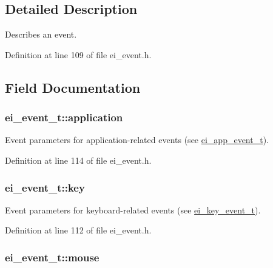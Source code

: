 \subsection{Detailed Description}
Describes an event. 

Definition at line 109 of file ei\+\_\+event.\+h.



\subsection{Field Documentation}
\hypertarget{structei__event__t_ab93b7dc04597613a3bd0195e74a9f7bb}{
\subsubsection[{application}]{ ei\+\_\+event\+\_\+t\+::application}}\label{structei__event__t_ab93b7dc04597613a3bd0195e74a9f7bb}


Event parameters for application-\/related events (see \hyperlink{structei__app__event__t}{ei\+\_\+app\+\_\+event\+\_\+t}). 



Definition at line 114 of file ei\+\_\+event.\+h.

\hypertarget{structei__event__t_a0f146bb41b78f27e18ecccc71f50026d}{
\subsubsection[{key}]{ ei\+\_\+event\+\_\+t\+::key}}\label{structei__event__t_a0f146bb41b78f27e18ecccc71f50026d}


Event parameters for keyboard-\/related events (see \hyperlink{structei__key__event__t}{ei\+\_\+key\+\_\+event\+\_\+t}). 



Definition at line 112 of file ei\+\_\+event.\+h.

\hypertarget{structei__event__t_a7f0b0d0cf765a822aca7a435510d9d85}{
\subsubsection[{mouse}]{ ei\+\_\+event\+\_\+t\+::mouse}}\label{structei__event__t_a7f0b0d0cf765a822aca7a435510d9d85}


